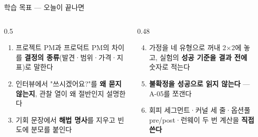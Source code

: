 \begin{frame}{학습 목표 — 오늘이 끝나면}
\begin{columns}[T]
\begin{column}{0.5\textwidth}
\begin{enumerate}
\item 프로젝트 PM과 프로덕트 PM의 차이를 \textbf{결정의 종류}(발견·범위·가격·지표)로 말한다
\item 인터뷰에서 "쓰시겠어요?"를 \textbf{왜 묻지 않는지}, 관찰 열이 왜 절반인지 설명한다
\item 기회 문장에서 \textbf{해법 명사}를 지우고 빈도에 분모를 붙인다
\end{enumerate}
\end{column}
\begin{column}{0.48\textwidth}
\begin{enumerate}\setcounter{enumi}{3}
\item 가정을 네 유형으로 꺼내 2×2에 놓고, 실험의 \textbf{성공 기준을 결과 전에} 숫자로 적는다
\item \textbf{불확정을 성공으로 읽지 않는다} — A-05를 쪼갠다
\item 회피 세그먼트·커널 세 줄·옵션풀 pre/post·런웨이 두 번 계산을 \textbf{직접 쓴다}
\end{enumerate}
\end{column}
\end{columns}
\end{frame}

